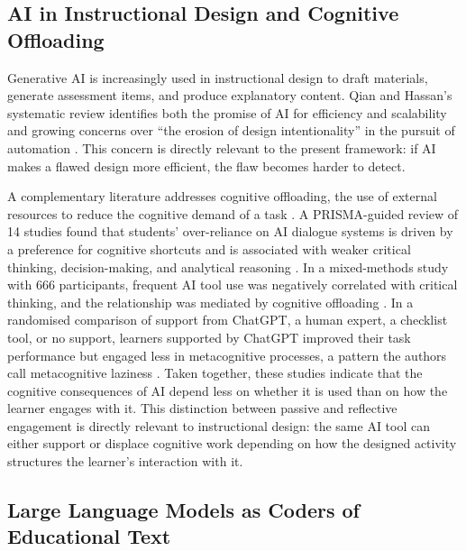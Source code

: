 \documentclass[journal,article,submit,pdftex,moreauthors]{Definitions/mdpi}
\begin{document}
\subsection{AI in Instructional Design and Cognitive Offloading}

Generative AI is increasingly used in instructional design to draft materials, generate assessment items, and produce explanatory content. Qian and Hassan's systematic review identifies both the promise of AI for efficiency and scalability and growing concerns over ``the erosion of design intentionality'' in the pursuit of automation \cite{qian_hassan_2025}. This concern is directly relevant to the present framework: if AI makes a flawed design more efficient, the flaw becomes harder to detect.

A complementary literature addresses cognitive offloading, the use of external resources to reduce the cognitive demand of a task \cite{risko_gilbert_2016}. A PRISMA-guided review of 14 studies found that students' over-reliance on AI dialogue systems is driven by a preference for cognitive shortcuts and is associated with weaker critical thinking, decision-making, and analytical reasoning \cite{zhai_2024}. In a mixed-methods study with 666 participants, frequent AI tool use was negatively correlated with critical thinking, and the relationship was mediated by cognitive offloading \cite{gerlich_2025}. In a randomised comparison of support from ChatGPT, a human expert, a checklist tool, or no support, learners supported by ChatGPT improved their task performance but engaged less in metacognitive processes, a pattern the authors call metacognitive laziness \cite{fan_2025}. Taken together, these studies indicate that the cognitive consequences of AI depend less on whether it is used than on how the learner engages with it. This distinction between passive and reflective engagement is directly relevant to instructional design: the same AI tool can either support or displace cognitive work depending on how the designed activity structures the learner's interaction with it.

\subsection{Large Language Models as Coders of Educational Text}
\end{document}
